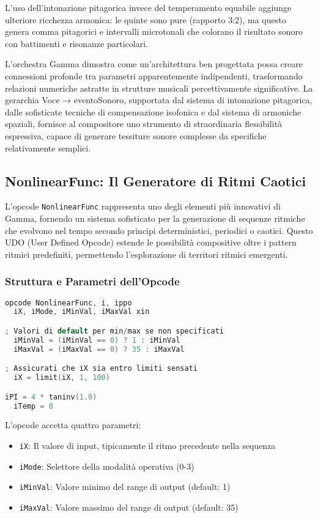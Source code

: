 L'uso dell'intonazione pitagorica invece del temperamento equabile aggiunge ulteriore ricchezza armonica: le quinte sono pure (rapporto 3:2), ma questo genera comma pitagorici e intervalli microtonali che colorano il risultato sonoro con battimenti e risonanze particolari.

L'orchestra Gamma dimostra come un'architettura ben progettata possa creare connessioni profonde tra parametri apparentemente indipendenti, trasformando relazioni numeriche astratte in strutture musicali percettivamente significative. La gerarchia Voce → eventoSonoro, supportata dal sistema di intonazione pitagorica, dalle sofisticate tecniche di compensazione isofonica e dal sistema di armoniche spaziali, fornisce al compositore uno strumento di straordinaria flessibilità espressiva, capace di generare tessiture sonore complesse da specifiche relativamente semplici.
\subsection{NonlinearFunc: Il Generatore di Ritmi Caotici}
L'opcode \texttt{NonlinearFunc} rappresenta uno degli elementi più innovativi di Gamma, fornendo un sistema sofisticato per la generazione di sequenze ritmiche che evolvono nel tempo secondo principi deterministici, periodici o caotici. Questo UDO (User Defined Opcode) estende le possibilità compositive oltre i pattern ritmici predefiniti, permettendo l'esplorazione di territori ritmici emergenti.
\subsubsection{Struttura e Parametri dell'Opcode}
\begin{lstlisting}[language=C]
opcode NonlinearFunc, i, ippo
  iX, iMode, iMinVal, iMaxVal xin

; Valori di default per min/max se non specificati
  iMinVal = (iMinVal == 0) ? 1 : iMinVal
  iMaxVal = (iMaxVal == 0) ? 35 : iMaxVal

; Assicurati che iX sia entro limiti sensati
  iX = limit(iX, 1, 100)

iPI = 4 * taninv(1.0)  
  iTemp = 0
\end{lstlisting}

L'opcode accetta quattro parametri:
\begin{itemize}
    \item \texttt{iX}: Il valore di input, tipicamente il ritmo precedente nella sequenza
    \item \texttt{iMode}: Selettore della modalità operativa (0-3)
    \item \texttt{iMinVal}: Valore minimo del range di output (default: 1)
    \item \texttt{iMaxVal}: Valore massimo del range di output (default: 35)
\end{itemize}

